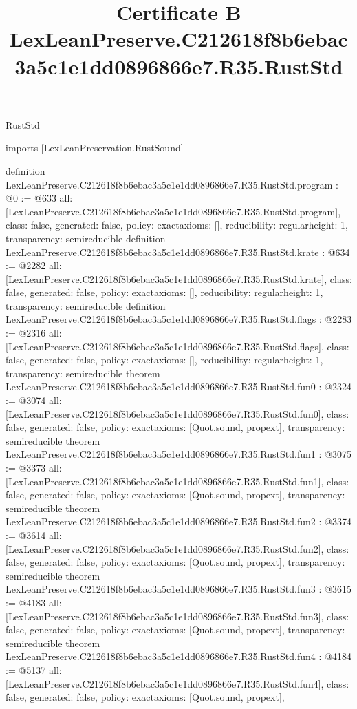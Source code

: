 \begin{lexlean}{RustStd}
\title{Certificate B LexLeanPreserve.C212618f8b6ebac3a5c1e1dd0896866e7.R35.RustStd}
\begin{coremodule}
imports [LexLeanPreservation.RustSound]

definition LexLeanPreserve.C212618f8b6ebac3a5c1e1dd0896866e7.R35.RustStd.program : @0 := @633 {
  all: [LexLeanPreserve.C212618f8b6ebac3a5c1e1dd0896866e7.R35.RustStd.program],
  class: false,
  generated: false,
  policy: exact{axioms: []},
  reducibility: regular{height: 1},
  transparency: semireducible
}
definition LexLeanPreserve.C212618f8b6ebac3a5c1e1dd0896866e7.R35.RustStd.krate : @634 := @2282 {
  all: [LexLeanPreserve.C212618f8b6ebac3a5c1e1dd0896866e7.R35.RustStd.krate],
  class: false,
  generated: false,
  policy: exact{axioms: []},
  reducibility: regular{height: 1},
  transparency: semireducible
}
definition LexLeanPreserve.C212618f8b6ebac3a5c1e1dd0896866e7.R35.RustStd.flags : @2283 := @2316 {
  all: [LexLeanPreserve.C212618f8b6ebac3a5c1e1dd0896866e7.R35.RustStd.flags],
  class: false,
  generated: false,
  policy: exact{axioms: []},
  reducibility: regular{height: 1},
  transparency: semireducible
}
theorem LexLeanPreserve.C212618f8b6ebac3a5c1e1dd0896866e7.R35.RustStd.fun0 : @2324 := @3074 {
  all: [LexLeanPreserve.C212618f8b6ebac3a5c1e1dd0896866e7.R35.RustStd.fun0],
  class: false,
  generated: false,
  policy: exact{axioms: [Quot.sound, propext]},
  transparency: semireducible
}
theorem LexLeanPreserve.C212618f8b6ebac3a5c1e1dd0896866e7.R35.RustStd.fun1 : @3075 := @3373 {
  all: [LexLeanPreserve.C212618f8b6ebac3a5c1e1dd0896866e7.R35.RustStd.fun1],
  class: false,
  generated: false,
  policy: exact{axioms: [Quot.sound, propext]},
  transparency: semireducible
}
theorem LexLeanPreserve.C212618f8b6ebac3a5c1e1dd0896866e7.R35.RustStd.fun2 : @3374 := @3614 {
  all: [LexLeanPreserve.C212618f8b6ebac3a5c1e1dd0896866e7.R35.RustStd.fun2],
  class: false,
  generated: false,
  policy: exact{axioms: [Quot.sound, propext]},
  transparency: semireducible
}
theorem LexLeanPreserve.C212618f8b6ebac3a5c1e1dd0896866e7.R35.RustStd.fun3 : @3615 := @4183 {
  all: [LexLeanPreserve.C212618f8b6ebac3a5c1e1dd0896866e7.R35.RustStd.fun3],
  class: false,
  generated: false,
  policy: exact{axioms: [Quot.sound, propext]},
  transparency: semireducible
}
theorem LexLeanPreserve.C212618f8b6ebac3a5c1e1dd0896866e7.R35.RustStd.fun4 : @4184 := @5137 {
  all: [LexLeanPreserve.C212618f8b6ebac3a5c1e1dd0896866e7.R35.RustStd.fun4],
  class: false,
  generated: false,
  policy: exact{axioms: [Quot.sound, propext]},
}
\end{coremodule}
\end{lexlean}
